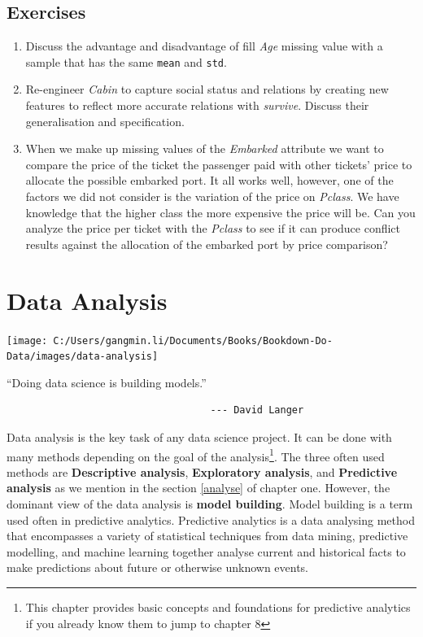 \documentclass[
]{book}
\providecommand{\tightlist}{%
  \setlength{\itemsep}{0pt}\setlength{\parskip}{0pt}}
\renewenvironment{quote}{\begin{VF}}{\end{VF}}
\begin{document}
\hypertarget{exercises-4}{%
\section*{Exercises}\label{exercises-4}}


\begin{enumerate}
\def\labelenumi{\arabic{enumi}.}
\tightlist
\item
  Discuss the advantage and disadvantage of fill \emph{Age} missing value with a sample that has the same \texttt{mean} and \texttt{std}.
\item
  Re-engineer \emph{Cabin} to capture social status and relations by creating new features to reflect more accurate relations with \emph{survive}. Discuss their generalisation and specification.
\item
  When we make up missing values of the \emph{Embarked} attribute we want to compare the price of the ticket the passenger paid with other tickets' price to allocate the possible embarked port. It all works well, however, one of the factors we did not consider is the variation of the price on \emph{Pclass}. We have knowledge that the higher class the more expensive the price will be. Can you analyze the price per ticket with the \emph{Pclass} to see if it can produce conflict results against the allocation of the embarked port by price comparison?
\end{enumerate}

\hypertarget{data-analysis}{%
\chapter{Data Analysis}\label{data-analysis}}

\begin{center}\texttt{[image: C:/Users/gangmin.li/Documents/Books/Bookdown-Do-Data/images/data-analysis]} \end{center}

\begin{quote}
``Doing data science is building models.''

\begin{verbatim}
                                   --- David Langer
\end{verbatim}
\end{quote}

Data analysis is the key task of any data science project. It can be done with many methods depending on the goal of the analysis\footnote{This chapter provides basic concepts and foundations for predictive analytics if you already know them to jump to chapter 8}. The three often used methods are \textbf{Descriptive analysis}, \textbf{Exploratory analysis}, and \textbf{Predictive analysis} as we mention in the section \ref{analyse} of chapter one. However, the dominant view of the data analysis is \textbf{model building}. Model building is a term used often in predictive analytics. Predictive analytics is a data analysing method that encompasses a variety of statistical techniques from data mining, predictive modelling, and machine learning together analyse current and historical facts to make predictions about future or otherwise unknown events.
\end{document}
